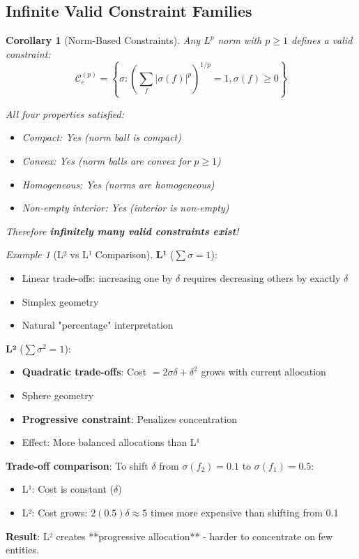 \documentclass[11pt,a4paper]{article}
\newtheorem{corollary}[theorem]{Corollary}
\theoremstyle{definition}
\theoremstyle{remark}
\newtheorem{example}[theorem]{Example}
\newcommand{\C}{\mathcal{C}}
\begin{document}
\subsection{Infinite Valid Constraint Families}

\begin{corollary}[Norm-Based Constraints]
Any $L^p$ norm with $p \ge 1$ defines a valid constraint:
\[ \C_e^{(p)} = \left\{\sigma : \left(\sum_f |\sigma(f)|^p\right)^{1/p} = 1, \sigma(f) \ge 0\right\} \]

All four properties satisfied:
\begin{itemize}
\item Compact: Yes (norm ball is compact)
\item Convex: Yes (norm balls are convex for $p \ge 1$)
\item Homogeneous: Yes (norms are homogeneous)
\item Non-empty interior: Yes (interior is non-empty)
\end{itemize}

Therefore \textbf{infinitely many valid constraints exist}!
\end{corollary}

\begin{example}[L² vs L¹ Comparison]
\textbf{L¹} ($\sum \sigma = 1$):
\begin{itemize}
\item Linear trade-offs: increasing one by $\delta$ requires decreasing others by exactly $\delta$
\item Simplex geometry
\item Natural "percentage" interpretation
\end{itemize}

\textbf{L²} ($\sum \sigma^2 = 1$):
\begin{itemize}
\item \textbf{Quadratic trade-offs}: Cost $= 2\sigma\delta + \delta^2$ grows with current allocation
\item Sphere geometry
\item \textbf{Progressive constraint}: Penalizes concentration
\item Effect: More balanced allocations than L¹
\end{itemize}

\textbf{Trade-off comparison}: To shift $\delta$ from $\sigma(f_2)=0.1$ to $\sigma(f_1)=0.5$:
\begin{itemize}
\item L¹: Cost is constant ($\delta$)
\item L²: Cost grows: $2(0.5)\delta \approx 5$ times more expensive than shifting from 0.1
\end{itemize}

\textbf{Result}: L² creates **progressive allocation** - harder to concentrate on few entities.
\end{example}
\end{document}
